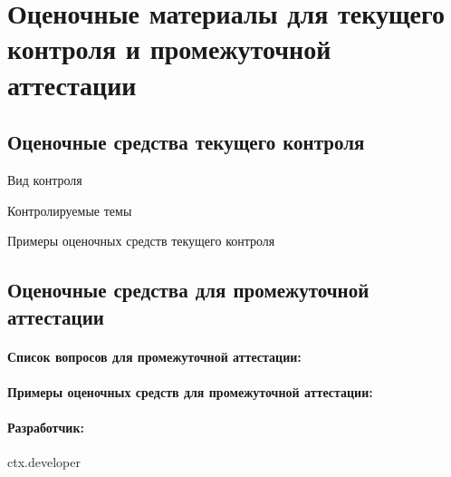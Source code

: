 \documentclass[12pt]{scrartcl}
\begin{document}
\section{Оценочные материалы для текущего контроля и
промежуточной аттестации}


\subsection{Оценочные средства текущего контроля}

Вид контроля

Контролируемые темы

Примеры оценочных средств текущего контроля

\subsection{Оценочные средства для промежуточной аттестации}

\paragraph{Список вопросов для промежуточной аттестации:}

\paragraph{Примеры оценочных средств для промежуточной аттестации:}

\par
\paragraph{\normalfont Разработчик:} {{ctx.developer}} %
\end{document}
